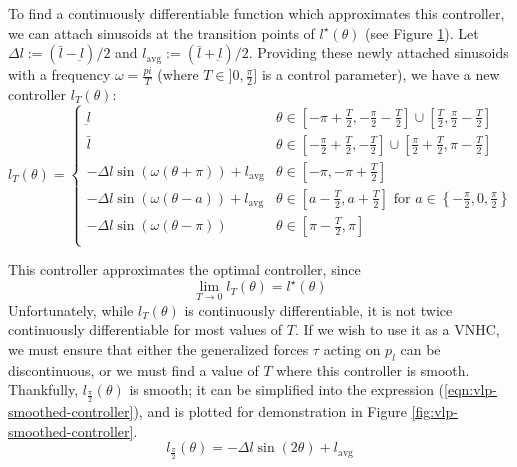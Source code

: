 To find a continuously differentiable function which approximates this controller,
we can attach sinusoids at the transition points of
\(l^\star(\theta)\) (see Figure \ref{fig:vlp-T-controller}). Let
\(\Delta l := (\bar{l} - \underbar{l})/2\) and 
\(l_{\text{avg}} := (\bar{l} + \underbar{l})/2\).
Providing these newly attached sinusoids with a frequency \(\omega = \frac{pi}{T}\) 
(where \(T \in ]0,\frac{\pi}{2}]\) is a control parameter), we have a new
controller \(l_T(\theta)\):
\begin{equation}\label{eqn:vlp-T-controller}
   l_T(\theta) = \begin{cases}
      \underbar{l} & \theta \in \left[-\pi + \frac{T}{2}, -\frac{\pi}{2} - \frac{T}{2}\right] 
      \cup \left[\frac{T}{2}, \frac{\pi}{2} - \frac{T}{2}\right] \\
      \bar{l} & \theta \in \left[-\frac{\pi}{2} + \frac{T}{2}, -\frac{T}{2}\right] 
      \cup \left[\frac{\pi}{2} + \frac{T}{2}, \pi - \frac{T}{2}\right] \\
      -\Delta l \sin(\omega(\theta + \pi)) + l_{\text{avg}} & \theta \in
      \left[-\pi,-\pi + \frac{T}{2}\right] \\
      -\Delta l \sin(\omega(\theta - a)) + l_\text{avg} & 
      \theta \in \left[a - \frac{T}{2}, a + \frac{T}{2}\right] \text{ for } 
      a \in \left\{-\frac{\pi}{2}, 0, \frac{\pi}{2}\right\} \\
      -\Delta l \sin(\omega(\theta-\pi)) & \theta \in \left[\pi - \frac{T}{2},\pi\right] \\
   \end{cases}
\end{equation}

\begin{figure}
   \centering
   \caption{}\label{fig:vlp-T-controller}
\end{figure}

This controller approximates the optimal controller, since 
\[
   \lim\limits_{T \rightarrow 0} l_T(\theta) = l^\star(\theta)
\]
Unfortunately, while \(l_T(\theta)\) is continuously differentiable, it is not
twice continuously differentiable for most values of \(T\).
If we wish to use it as a VNHC, we must ensure that either the generalized
forces \(\tau\) acting on \(p_l\) can be discontinuous, or we must find a value
of \(T\) where this controller is smooth.
Thankfully, \(l_{\frac{\pi}{2}}(\theta)\) is smooth; it can be simplified into
the expression (\ref{eqn:vlp-smoothed-controller}), and is plotted for
demonstration in Figure \ref{fig:vlp-smoothed-controller}.
\begin{equation}\label{eqn:vlp-smoothed-controller}
   l_\frac{\pi}{2}(\theta) = -\Delta l \sin(2\theta) + l_{\text{avg}}
\end{equation}

